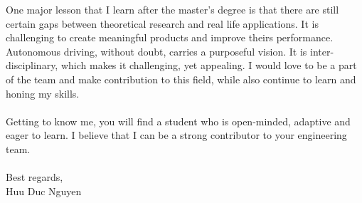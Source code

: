 \documentclass[
10pt, A4, english,
draft = false,
twoside = false,
]{article}
\begin{document}
{		One major lesson that I learn after the master's degree is that there are still certain gaps between theoretical research and real life applications. It is challenging to create meaningful products and improve theirs performance. Autonomous driving, without doubt, carries a purposeful vision. It is inter-disciplinary, which makes it challenging, yet appealing. I would love to be a part of the team and make contribution to this field, while also continue to learn and honing my skills.\\~\\
		Getting to know me, you will find a student who is open-minded, adaptive and eager to learn. I believe that I can be a strong contributor to your engineering team.\\~\\
		Best regards,\\
		Huu Duc Nguyen		
	}
\end{document}

